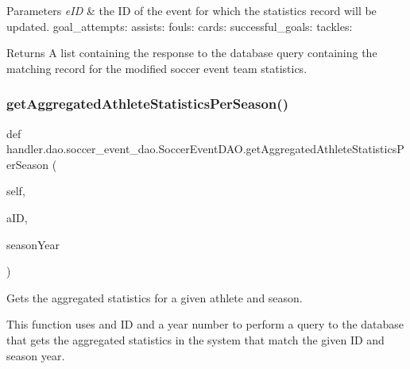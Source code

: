 \begin{DoxyParams}{Parameters}
{\em e\+ID} & the ID of the event for which the statistics record will be updated. goal\+\_\+attempts\+: assists\+: fouls\+: cards\+: successful\+\_\+goals\+: tackles\+:\\
\hline
\end{DoxyParams}
\begin{DoxyReturn}{Returns}
A list containing the response to the database query containing the matching record for the modified soccer event team statistics. 
\end{DoxyReturn}
\mbox{\label{classhandler_1_1dao_1_1soccer__event__dao_1_1_soccer_event_d_a_o_ab2cfce918ec805e7eab71acc5172aa86}} 
\subsubsection{\texorpdfstring{get\+Aggregated\+Athlete\+Statistics\+Per\+Season()}{getAggregatedAthleteStatisticsPerSeason()}}
{\footnotesize\ttfamily def handler.\+dao.\+soccer\+\_\+event\+\_\+dao.\+Soccer\+Event\+D\+A\+O.\+get\+Aggregated\+Athlete\+Statistics\+Per\+Season (\begin{DoxyParamCaption}\item[{}]{self,  }\item[{}]{a\+ID,  }\item[{}]{season\+Year }\end{DoxyParamCaption})}



Gets the aggregated statistics for a given athlete and season. 

This function uses and ID and a year number to perform a query to the database that gets the aggregated statistics in the system that match the given ID and season year.


